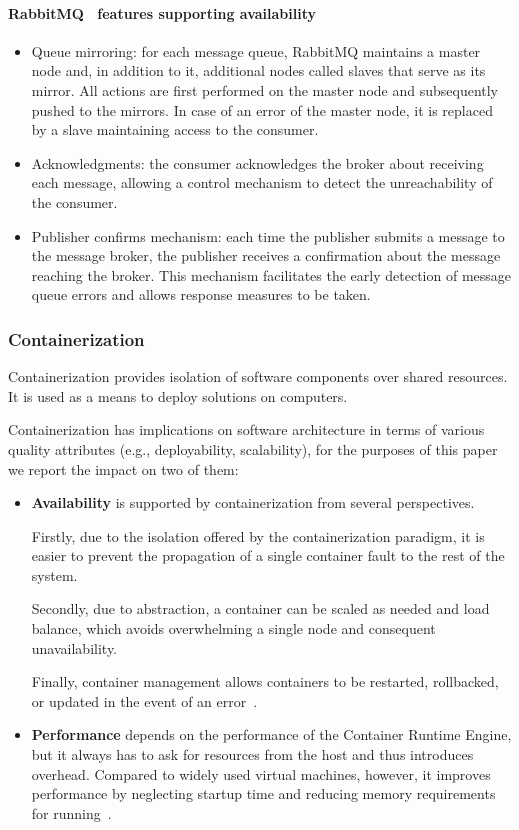 \documentclass[conference]{IEEEtran}
\begin{document}
\paragraph{RabbitMQ~\cite{rabbitmq2024Dec} features supporting availability} \label{par:rabbitmq-availability}

\begin{itemize}
    \item Queue mirroring: for each message queue, RabbitMQ maintains a master node and, in addition to it, additional nodes called slaves that serve as its mirror. All actions are first performed on the master node and subsequently pushed to the mirrors. In case of an error of the master node, it is replaced by a slave maintaining access to the consumer.
    \item Acknowledgments: the consumer acknowledges the broker about receiving each message, allowing a control mechanism to detect the unreachability of the consumer.
    \item Publisher confirms mechanism: each time the publisher submits a message to the message broker, the publisher receives a confirmation about the message reaching the broker. This mechanism facilitates the early detection of message queue errors and allows response measures to be taken.
\end{itemize}

\subsubsection{Containerization}
Containerization provides isolation of software components over shared resources. It is used as a means to deploy solutions on computers. 

Containerization has implications on software architecture in terms of various quality attributes (e.g., deployability, scalability), for the purposes of this paper we report the impact on two of them:
\begin{itemize}
    \item \textbf{Availability} is supported by containerization from several perspectives.
    
    Firstly, due to the isolation offered by the containerization paradigm, it is easier to prevent the propagation of a single container fault to the rest of the system.
    
    Secondly, due to abstraction, a container can be scaled as needed and load balance, which avoids overwhelming a single node and consequent unavailability.
    
    Finally, container management allows containers to be restarted, rollbacked, or updated in the event of an error~\cite{b1}.
    \item \textbf{Performance} depends on the performance of the Container Runtime Engine, but it always has to ask for resources from the host and thus introduces overhead. Compared to widely used virtual machines, however, it improves performance by neglecting startup time and reducing memory requirements for running~\cite{b1}.
\end{itemize}
\end{document}
